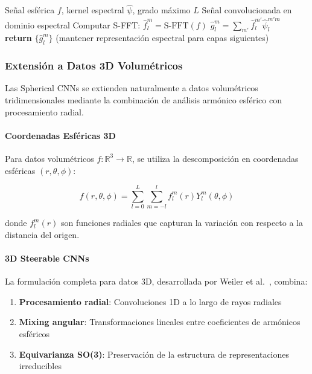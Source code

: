 \begin{algorithm}[h]
\caption{Convolución Spherical CNN Eficiente}
\label{alg:spherical_conv}
\begin{algorithmic}[1]
\Require Señal esférica $f$, kernel espectral $\hat{\psi}$, grado máximo $L$
\Ensure Señal convolucionada en dominio espectral
\State Computar S-FFT: $\hat{f}_l^m = \text{S-FFT}(f)$
        \State $\hat{g}_l^m = \sum_{m'} \hat{f}_l^{m'} \hat{\psi}_l^{m'm}$
    \EndFor
\EndFor
\State \textbf{return} $\{\hat{g}_l^m\}$ (mantener representación espectral para capas siguientes)
\end{algorithmic}
\end{algorithm}

\subsubsection{Extensión a Datos 3D Volumétricos}

Las Spherical CNNs se extienden naturalmente a datos volumétricos tridimensionales mediante la combinación de análisis armónico esférico con procesamiento radial.

\paragraph{Coordenadas Esféricas 3D}

Para datos volumétricos $f: \mathbb{R}^3 \to \mathbb{R}$, se utiliza la descomposición en coordenadas esféricas $(r, \theta, \phi)$:

\begin{equation}
f(r, \theta, \phi) = \sum_{l=0}^{L} \sum_{m=-l}^{l} f_l^m(r) Y_l^m(\theta, \phi)
\end{equation}

donde $f_l^m(r)$ son funciones radiales que capturan la variación con respecto a la distancia del origen.

\paragraph{3D Steerable CNNs}

La formulación completa para datos 3D, desarrollada por Weiler et al.~\citep{weiler2018steerable}, combina:

\begin{enumerate}
    \item \textbf{Procesamiento radial}: Convoluciones 1D a lo largo de rayos radiales
    \item \textbf{Mixing angular}: Transformaciones lineales entre coeficientes de armónicos esféricos
    \item \textbf{Equivarianza SO(3)}: Preservación de la estructura de representaciones irreducibles
\end{enumerate}

